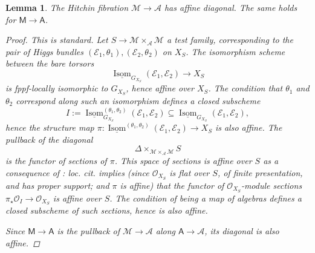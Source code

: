 \documentclass[openany]{amsbook}
\newtheorem{lemma}[theorem]{Lemma}
\theoremstyle{definition}
\theoremstyle{remark}
\numberwithin{equation}{section}
\renewcommand{\O}{\mathcal{O}}
\newcommand{\cA}{\mathcal{A}}
\newcommand{\cM}{\mathcal{M}}
\newcommand{\cE}{\mathcal{E}}
\newcommand{\ul}[1]{\underline{#1}}
\renewcommand{\-}{\operatorname{-}}
\newcommand{\on}[1]{\operatorname{#1}}
\newcommand{\bM}{\mathsf{M}}
\newcommand{\bA}{\mathsf{A}}
\begin{document}
\begin{lemma}\label{lem.aff.diag}
    The Hitchin fibration $\cM \to \cA$ has affine diagonal. The same holds for $\bM \to \bA$.
    \begin{proof}
        This is standard. Let $S \to \cM \times_{\cA} \cM$ a test family, corresponding to the pair of Higgs bundles $(\cE_1, \theta_1), (\cE_2, \theta_2)$ on $X_{S}$. The isomorphism scheme between the bare torsors
        $$
            \ul{\on{Isom}}_{G_{X_S}}(\cE_1, \cE_2) \to X_S
        $$
        is fppf-locally isomorphic to $G_{X_S}$, hence affine over $X_S$. The condition that $\theta_1$ and $\theta_2$ correspond along such an isomorphism defines a closed subscheme
        $$
            I := \ul{\on{Isom}}_{G_{X_S}}^{(\theta_1, \theta_2)}(\cE_1, \cE_2) \subseteq \ul{\on{Isom}}_{G_{X_S}}(\cE_1, \cE_2),
        $$
        hence the structure map $\pi :\ul{\on{Isom}}^{(\theta_1, \theta_2)}(\cE_1, \cE_2) \to X_S$ is also affine. The pullback of the diagonal
        $$
            \Delta \times_{\cM \times_{\cA} \cM} S
        $$
        is the functor of sections of $\pi$. This space of sections is affine over $S$ as a consequence of \cite[Tag 08K6]{stacks-project}: \textit{loc. cit.} implies (since $\O_{X_S}$ is flat over $S$, of finite presentation, and has proper support; and $\pi$ is affine) that the functor of $\O_{X_S}$-\textit{module} sections $\pi_\star \O_{I} \to \O_{X_S}$ is affine over $S$. The condition of being a map of algebras defines a closed subscheme of such sections, hence is also affine.

        Since $\bM \to \bA$ is the pullback of $\cM \to \cA$ along $\bA \to \cA$, its diagonal is also affine.
    \end{proof}
\end{lemma}
\end{document}
